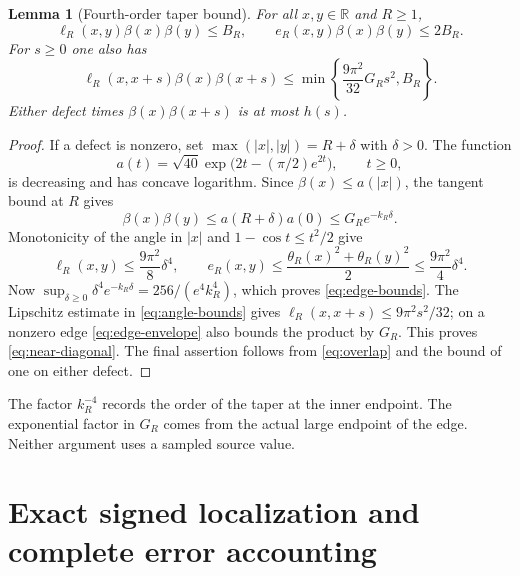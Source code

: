 \documentclass[11pt]{article}
\newtheorem{lemma}[theorem]{Lemma}
\theoremstyle{remark}\newtheorem{remark}[theorem]{Remark}
\newcommand{\R}{\mathbb R}
\numberwithin{equation}{section}
\begin{document}
\begin{lemma}[Fourth-order taper bound]\label{lem:edges}
For all $x,y\in\R$ and $R\ge1$,
\begin{equation}\label{eq:edge-bounds}
 \ell_R(x,y)\beta(x)\beta(y)\le B_R,\qquad
 e_R(x,y)\beta(x)\beta(y)\le2B_R.
\end{equation}
For $s\ge0$ one also has
\begin{equation}\label{eq:near-diagonal}
 \ell_R(x,x+s)\beta(x)\beta(x+s)
 \le\min\left\{\frac{9\pi^2}{32}G_Rs^2,B_R\right\}.
\end{equation}
Either defect times $\beta(x)\beta(x+s)$ is at most $h(s)$.
\end{lemma}
\begin{proof}
If a defect is nonzero, set $\max(|x|,|y|)=R+\delta$ with $\delta>0$.
The function
\[
 a(t)=\sqrt{40}\exp\bigl(2t-(\pi/2)e^{2t}\bigr),\qquad t\ge0,
\]
is decreasing and has concave logarithm. Since $\beta(x)\le a(|x|)$,
the tangent bound at $R$ gives
\begin{equation}\label{eq:edge-envelope}
 \beta(x)\beta(y)\le a(R+\delta)a(0)
                    \le G_Re^{-k_R\delta}.
\end{equation}
Monotonicity of the angle in $|x|$ and $1-\cos t\le t^2/2$ give
\[
 \ell_R(x,y)\le\frac{9\pi^2}{8}\delta^4,\qquad
 e_R(x,y)\le\frac{\theta_R(x)^2+\theta_R(y)^2}{2}
                  \le\frac{9\pi^2}{4}\delta^4.
\]
Now $\sup_{\delta\ge0}\delta^4e^{-k_R\delta}=256/(e^4k_R^4)$,
which proves \eqref{eq:edge-bounds}. The Lipschitz estimate in
\eqref{eq:angle-bounds} gives
$\ell_R(x,x+s)\le9\pi^2s^2/32$; on a nonzero edge
\eqref{eq:edge-envelope} also bounds the product by $G_R$.
This proves \eqref{eq:near-diagonal}. The final assertion follows from
\eqref{eq:overlap} and the bound of one on either defect.
\end{proof}

The factor $k_R^{-4}$ records the order of the taper at the inner endpoint.
The exponential factor in $G_R$ comes from the actual large endpoint of
the edge. Neither argument uses a sampled source value.

\section{Exact signed localization and complete error accounting}
\end{document}

